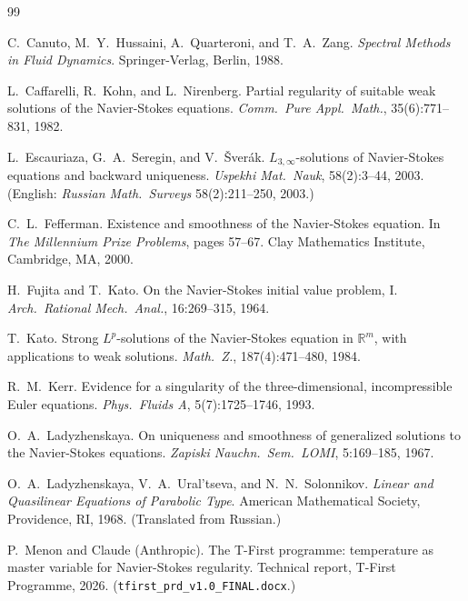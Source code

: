 \documentclass[12pt]{article}
\theoremstyle{definition}
\begin{document}
\begin{thebibliography}{99}

  C.~Canuto, M.~Y.~Hussaini, A.~Quarteroni, and T.~A.~Zang.
  \newblock \emph{Spectral Methods in Fluid Dynamics}.
  \newblock Springer-Verlag, Berlin, 1988.

  L.~Caffarelli, R.~Kohn, and L.~Nirenberg.
  \newblock Partial regularity of suitable weak solutions of the Navier-Stokes equations.
  \newblock \emph{Comm.\ Pure Appl.\ Math.}, 35(6):771--831, 1982.

  L.~Escauriaza, G.~A.~Seregin, and V.~\v{S}ver\'{a}k.
  \newblock $L_{3,\infty}$-solutions of Navier-Stokes equations and backward uniqueness.
  \newblock \emph{Uspekhi Mat.\ Nauk}, 58(2):3--44, 2003.
  \newblock (English: \emph{Russian Math.\ Surveys} 58(2):211--250, 2003.)

  C.~L.~Fefferman.
  \newblock Existence and smoothness of the Navier-Stokes equation.
  \newblock In \emph{The Millennium Prize Problems}, pages 57--67.
            Clay Mathematics Institute, Cambridge, MA, 2000.

  H.~Fujita and T.~Kato.
  \newblock On the Navier-Stokes initial value problem, I.
  \newblock \emph{Arch.\ Rational Mech.\ Anal.}, 16:269--315, 1964.

  T.~Kato.
  \newblock Strong $L^p$-solutions of the Navier-Stokes equation in $\mathbb{R}^m$,
            with applications to weak solutions.
  \newblock \emph{Math.\ Z.}, 187(4):471--480, 1984.

  R.~M.~Kerr.
  \newblock Evidence for a singularity of the three-dimensional, incompressible
            Euler equations.
  \newblock \emph{Phys.\ Fluids A}, 5(7):1725--1746, 1993.

  O.~A.~Ladyzhenskaya.
  \newblock On uniqueness and smoothness of generalized solutions to the
            Navier-Stokes equations.
  \newblock \emph{Zapiski Nauchn.\ Sem.\ LOMI}, 5:169--185, 1967.

  O.~A.~Ladyzhenskaya, V.~A.~Ural'tseva, and N.~N.~Solonnikov.
  \newblock \emph{Linear and Quasilinear Equations of Parabolic Type}.
  \newblock American Mathematical Society, Providence, RI, 1968.
  \newblock (Translated from Russian.)

  P.~Menon and Claude (Anthropic).
  \newblock The T-First programme: temperature as master variable for
            Navier-Stokes regularity.
  \newblock Technical report, T-First Programme, 2026.
  \newblock (\texttt{tfirst\_prd\_v1.0\_FINAL.docx}.)


\end{thebibliography}
\end{document}
